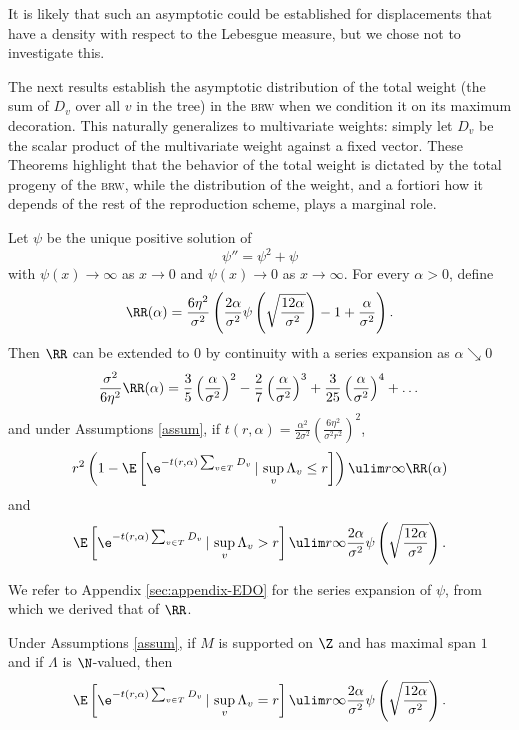 \documentclass[10pt,a4paper]{article}
\newcommand{\brw}{\textsc{brw}\xspace}
\newcommand{\repscheme}{reproduction scheme\xspace}
\begin{document}
It is likely that such an asymptotic could be established for displacements that have a density with respect to the Lebesgue measure, but we chose not to investigate this. 

The next results establish the asymptotic distribution of the total weight (the sum of $D_v$ over all $v$ in the tree) in the \brw when we condition it on its maximum decoration. This naturally generalizes to multivariate weights: simply let $D_v$ be the scalar product of the multivariate weight against a fixed vector. These Theorems highlight that the behavior of the total weight is dictated by the total progeny of the \brw, while the distribution of the weight, and a fortiori how it depends of the rest of the \repscheme, plays a marginal role. 



\begin{theorem}\label{th:main-volume-smaller}
Let $\psi$ be the unique positive solution of
\[ \psi'' = \psi^2 + \psi \]
with $\psi(x)\to\infty$ as $x\to 0$ and $\psi(x)\to 0$ as $x\to\infty$. For every $\alpha>0$, define 
\[\RR(\alpha) = \frac{6 \eta^2}{\sigma^2} \left(\frac{2\alpha}{\sigma^2} \psi\left( \sqrt{\frac{12\alpha}{\sigma^2}}\right) - 1 + \frac{\alpha}{\sigma^2} \right).\]
Then $\RR$ can be extended to $0$ by continuity with a series expansion as $\alpha\searrow 0$
\[ \frac{\sigma^2}{6\eta^2} \RR(\alpha) = \frac{3}{5}\left(\frac{\alpha}{\sigma^2}\right)^2 - \frac{2}{7}\left(\frac{\alpha}{\sigma^2}\right)^3 + \frac{3}{25}\left(\frac{\alpha}{\sigma^2}\right)^4 + \dots  \]
and under Assumptions \ref{assum}, %
if $t(r,\alpha) = \frac{\alpha^2}{2\sigma^2} \left(\frac{6\eta^2}{\sigma^2 r^2}\right)^2$, 
\[ r^2\left( 1 - \E\left[ \e^{-t(r,\alpha)\sum_{v\in T} D_v} \, | \, \sup_v \Lambda_v \leq r \right]\right) \ulim r \infty \RR(\alpha) \]
and
\[ \E\left[ \e^{-t(r,\alpha)\sum_{v\in T} D_v} \, | \, \sup_v \Lambda_v > r \right] \ulim r \infty \frac{2\alpha}{\sigma^2}\psi\left( \sqrt{\frac{12\alpha}{\sigma^2}} \right) . \]
\end{theorem}

We refer to Appendix \ref{sec:appendix-EDO} for the series expansion of $\psi$, from which we derived that of $\RR$. 


\begin{theorem}\label{th:main-condition-vol}
Under Assumptions \ref{assum}, %
if $M$ is supported on $\Z$ and has maximal span $1$ and if $\Lambda$ is $\N$-valued, then %
\[ \E\left[ \e^{-t(r,\alpha)\sum_{v\in T} D_v} \, | \, \sup_v \Lambda_v = r \right] \ulim r \infty \frac{2\alpha}{\sigma^2}\psi\left( \sqrt{\frac{12\alpha}{\sigma^2}} \right) . \]
\end{theorem}
\end{document}
